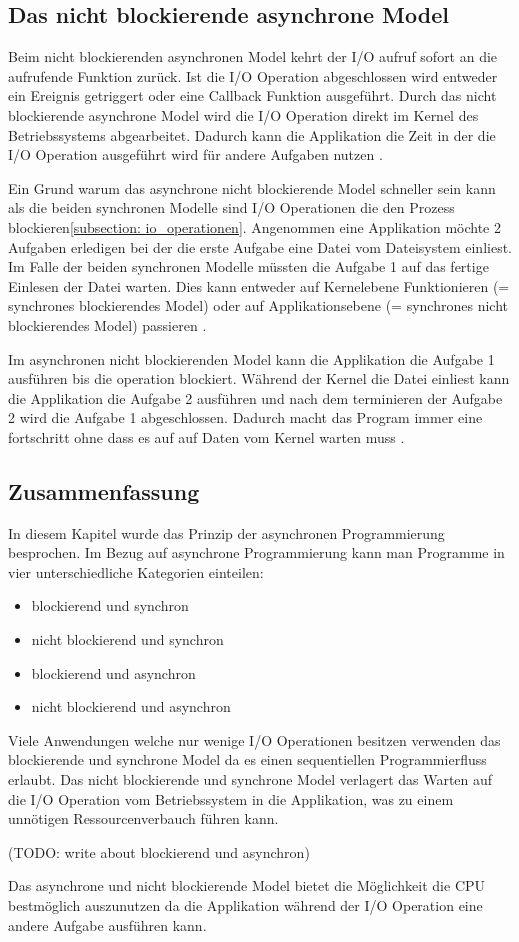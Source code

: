 \subsection{Das nicht blockierende asynchrone Model}
Beim nicht blockierenden asynchronen Model kehrt der I/O aufruf sofort an die aufrufende Funktion zurück. Ist die I/O Operation abgeschlossen wird entweder ein Ereignis getriggert oder eine Callback Funktion ausgeführt. Durch das nicht blockierende asynchrone Model wird die I/O Operation direkt im Kernel des Betriebssystems abgearbeitet. Dadurch kann die Applikation die Zeit in der die I/O Operation ausgeführt wird für andere Aufgaben nutzen \cite[p. 48]{Erb2012}.

Ein Grund warum das asynchrone nicht blockierende Model schneller sein kann als die beiden synchronen Modelle sind I/O Operationen die den Prozess blockieren\ref{subsection: io_operationen}. Angenommen eine Applikation möchte 2 Aufgaben erledigen bei der die erste Aufgabe eine Datei vom Dateisystem einliest. Im Falle der beiden synchronen Modelle müssten die Aufgabe 1 auf das fertige Einlesen der Datei warten. Dies kann entweder auf Kernelebene Funktionieren (= synchrones blockierendes Model) oder auf Applikationsebene (= synchrones nicht blockierendes Model) passieren \cite[]{Pet2015}. 

Im asynchronen nicht blockierenden Model kann die Applikation die Aufgabe 1 ausführen bis die operation blockiert. Während der Kernel die Datei einliest kann die Applikation die Aufgabe 2 ausführen und nach dem terminieren der Aufgabe 2 wird die Aufgabe 1 abgeschlossen. Dadurch macht das Program immer eine fortschritt ohne dass es auf auf Daten vom Kernel warten muss \cite[]{Pet2015}.

\subsection{Zusammenfassung}

In diesem Kapitel wurde das Prinzip der asynchronen Programmierung besprochen. Im Bezug auf asynchrone Programmierung kann man Programme in vier unterschiedliche Kategorien einteilen: 

\begin{itemize}
  \item blockierend und synchron
  \item nicht blockierend und synchron
  \item blockierend und asynchron
  \item nicht blockierend und asynchron
\end{itemize}    

Viele Anwendungen welche nur wenige I/O Operationen besitzen verwenden das blockierende und synchrone Model da es einen sequentiellen Programmierfluss erlaubt. Das nicht blockierende und synchrone Model verlagert das Warten auf die I/O Operation vom Betriebssystem in die Applikation, was zu einem unnötigen Ressourcenverbauch führen kann. 

(TODO: write about blockierend und asynchron)

Das asynchrone und nicht blockierende Model bietet die Möglichkeit die CPU bestmöglich auszunutzen da die Applikation während der I/O Operation eine andere Aufgabe ausführen kann. 

